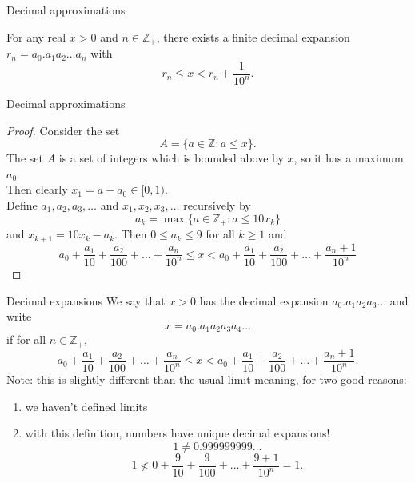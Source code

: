 \documentclass{beamer}
\begin{document}
\begin{frame}{Decimal approximations}
\begin{thm}
For any real $x > 0$ and $n\in \mathbb{Z}_+$, there exists a finite decimal expansion $r_n=a_0.a_1a_2\dots a_n$ with
$$r_n \leq x < r_n + \frac{1}{10^n}.$$
\end{thm}
\end{frame}

\begin{frame}{Decimal approximations}
\begin{proof}
Consider the set
$$A = \{a\in\mathbb{Z}: a\leq x\}.$$
\pause
The set $A$ is a set of integers which is bounded above by $x$, so it has a maximum $a_0$. \\
\pause
Then clearly $x_1 = a-a_0\in [0,1)$. \\
\pause
Define $a_1,a_2,a_3,\dots$ and $x_1,x_2,x_3,\dots$ recursively by
$$a_k = \max\{a\in\mathbb{Z}_+: a\leq 10x_{k}\}$$
and $x_{k+1}=10x_k-a_k$.
\pause
Then $0\leq a_k \leq 9$ for all $k\geq 1$ 
\pause
and 
$$a_0 + \frac{a_1}{10} + \frac{a_2}{100} + \dots + \frac{a_n}{10^n}
\leq x < a_0 + \frac{a_1}{10} + \frac{a_2}{100} + \dots + \frac{a_n+1}{10^n}
$$
\end{proof}
\end{frame}

\begin{frame}{Decimal expansions}
We say that $x>0$ has the decimal expansion $a_0.a_1a_2a_3\dots$ and write
$$x = a_0.a_1a_2a_3a_4\dots$$
\pause
if for all $n\in\mathbb{Z}_+$,
$$a_0 + \frac{a_1}{10} + \frac{a_2}{100} + \dots + \frac{a_n}{10^n}
\leq x < a_0 + \frac{a_1}{10} + \frac{a_2}{100} + \dots + \frac{a_n+1}{10^n}.
$$
\pause
Note: this is slightly different than the usual limit meaning, for two good reasons:
\begin{enumerate}
\pause
\item we haven't defined limits
\pause
\item with this definition, numbers have unique decimal expansions!
\pause
$$1\neq 0.999999999\dots$$
\pause
$$1 \nless 0 + \frac{9}{10} + \frac{9}{100} + \dots + \frac{9+1}{10^n} = 1.$$
\end{enumerate}
\end{frame}
\end{document}
